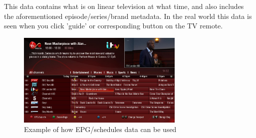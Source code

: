 \documentclass{article}
\begin{document}
  This data contains what is on linear television at what time, and also includes the aforementioned episode/series/brand metadata. In the real world this data
  is seen when you click 'guide' or corresponding button on the TV remote.

  \begin{figure}[H]
    \centering
    \includegraphics[width=8cm]{assets/epg.jpeg}
    \caption{Example of how EPG/schedules data can be used}
    \label{fig:epgExample}
  \end{figure}
  \newpage

  
  
  
\end{document}
